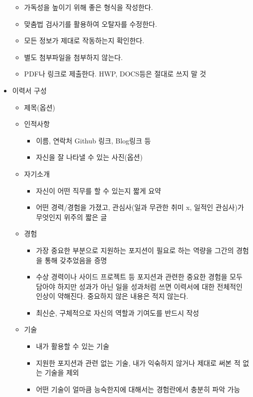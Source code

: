 \documentclass{article}
\begin{document}
\begin{itemize}
\begin{itemize}
        \item 가독성을 높이기 위해 좋은 형식을 작성한다.
        \item 맞춤법 검사기를 활용하여 오탈자를 수정한다.
        \item 모든 정보가 제대로 작동하는지 확인한다.
        \item 별도 첨부파일을 첨부하지 않는다.
        \item PDF나 링크로 제출한다. HWP, DOCS등은 절대로 쓰지 말 것
    \end{itemize}
    \item 이력서 구성
    \begin{itemize}
        \item 제목(옵션)
        \item 인적사항
        \begin{itemize}
            \item 이름, 연락처 Github 링크, Blog링크 등
            \item 자신을 잘 나타낼 수 있는 사진(옵션)
        \end{itemize}
        \item 자기소개
        \begin{itemize}
            \item 자신이 어떤 직무를 할 수 있는지 짧게 요약
            \item 어떤 경력/경험을 가졌고, 관심사(일과 무관한 취미 x, 일적인 관심사)가 무엇인지 위주의 짧은 글
        \end{itemize}
        \item 경험
        \begin{itemize}
            \item 가장 중요한 부분으로 지원하는 포지션이 필요로 하는 역량을 그간의 경험을 통해 갖추었음을 증명
            \item 수상 경력이나 사이드 프로젝트 등 포지션과 관련한 중요한 경험을 모두 담아야 하지만 성과가 아닌 일을 성과처럼 쓰면 이력서에 대한 전체적인 인상이 약해진다. 중요하지 않은 내용은 적지 않는다.
            \item 최신순, 구체적으로 자신의 역할과 기여도를 반드시 작성
        \end{itemize}
        \item 기술
        \begin{itemize}
            \item 내가 활용할 수 있는 기술
            \item 지원한 포지션과 관련 없는 기술, 내가 익숚하지 않거나 제대로 써본 적 없는 기술을 제외
            \item 어떤 기술이 얼마큼 능숙한지에 대해서는 경험란에서 충분히 파악 가능

\end{itemize}
\end{itemize}
\end{itemize}
\end{document}
